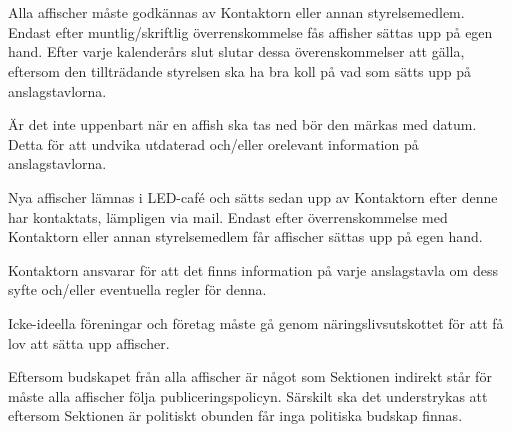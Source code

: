 \documentclass[10pt]{article}
\begin{document}
    \section*{\doctitle}
    \begin{dashlist}
        \item Alla affischer måste godkännas av Kontaktorn eller annan styrelsemedlem. Endast efter muntlig/skriftlig överrenskommelse fås affisher sättas upp på egen hand. Efter varje kalenderårs slut slutar dessa överenskommelser att gälla, eftersom den tillträdande styrelsen ska ha bra koll på vad som sätts upp på anslagstavlorna.

        \item Är det inte uppenbart när en affish ska tas ned bör den märkas med datum. Detta för att undvika utdaterad och/eller orelevant information på anslagstavlorna.

        \item Nya affischer lämnas i LED-café och sätts sedan upp av Kontaktorn efter denne har kontaktats, lämpligen via mail. Endast efter överrenskommelse med Kontaktorn eller annan styrelsemedlem får affischer sättas upp på egen hand.

        \item Kontaktorn ansvarar för att det finns information på varje anslagstavla om dess syfte och/eller eventuella regler för denna.

        \item Icke-ideella föreningar och företag måste gå genom näringslivsutskottet för att få lov att sätta upp affischer.

        \item Eftersom budskapet från alla affischer är något som Sektionen indirekt står för måste alla affischer följa publiceringspolicyn. Särskilt ska det understrykas att eftersom Sektionen är politiskt obunden får inga politiska budskap finnas.
    \end{dashlist}
\end{document}
